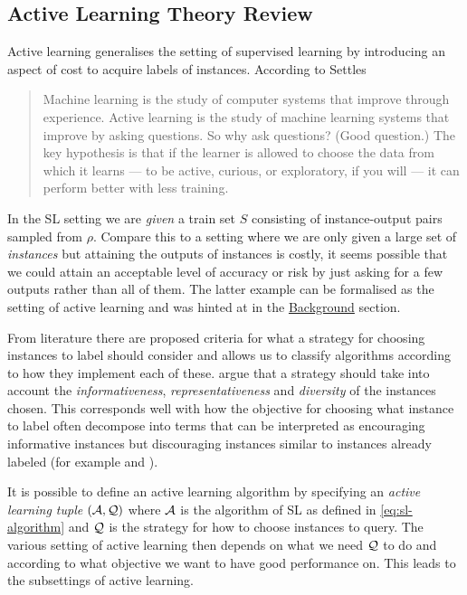 \subsection{Active Learning Theory Review}
\label{sec:al-theory-review}
Active learning generalises the
setting of supervised learning by introducing an aspect of cost to acquire
labels of instances. According to Settles \citep[Preface]{settles12_activ_learn}
\begin{quote}
  Machine learning is the study of computer systems that improve through experience. Active learning
  is the study of machine learning systems that improve by asking questions. So why ask questions?
  (Good question.) The key hypothesis is that if the learner is allowed to choose the data from which
  it learns — to be active, curious, or exploratory, if you will — it can perform better with less training.
\end{quote}
In the SL setting we are \emph{given} a train set \(S\) consisting
of instance-output pairs sampled from \(\rho\). Compare this to a setting
where we are only given a large set of \emph{instances} but attaining the
outputs of instances is costly, it seems possible that we could attain an
acceptable level of accuracy or risk by just asking for a few outputs rather
than all of them. The latter example can be formalised as the setting of active
learning and was hinted at in the \hyperref[sec:background]{Background} section.

From literature there are proposed criteria for what a strategy for choosing
instances to label should consider and allows us to classify algorithms
according to how they implement each of these.
\citep{wu18_pool_based_sequen_activ_learn_regres} argue that a strategy should
take into account the \emph{informativeness}, \emph{representativeness} and
\emph{diversity} of the instances chosen. This corresponds well with how the
objective for choosing what instance to label often decompose into terms that
can be interpreted as encouraging informative instances but discouraging instances similar to instances already labeled (for
example \citep[Equation 4]{guo08_discr} and \citep[Equation
7]{chattopadhyay13_batch_mode_activ_sampl_based}).

It is possible to define an active learning algorithm by specifying an
\emph{active learning tuple} \((\mathcal{A}, \mathcal{Q})\) where \(\mathcal{A}\) is the
algorithm of SL as defined in \ref{eq:sl-algorithm} and \(\mathcal{Q}\) is the strategy for how to choose instances
to query. The various setting of active learning then depends on what we need
\(\mathcal{Q}\) to do and according to what objective we want to have good
performance on. This leads to the subsettings of active learning.

